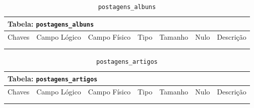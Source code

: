 \documentclass[12pt,a4paper]{article}
\begin{document}
\begin{center}
\begin{table}[h!]
	\caption{\texttt{postagens\_albuns}}
	\label{tabela:postagensAlbuns}
	\begin{tabular}{|p{1cm}|p{1.5cm}|p{1.25cm}|p{1.25cm}|p{1.75cm}|p{1.25cm}|p{4.5cm}|}\hline	
		\multicolumn{7}{|p{16cm}|}{\cellcolor{cinzaClaro}  \centering Tabela: \texttt{postagens\_albuns}} \\ \hline %
		{\small Chaves} & {\small Campo Lógico} & {\small Campo Físico} & {\small Tipo} & {\small Tamanho} & {\small Nulo} & {\small Descrição}\\\hline %
		
		{\tiny } & {\tiny } & {\tiny } & {\tiny } & {\tiny } & {\tiny } &{\tiny }\\\hline
		{\tiny } & {\tiny } & {\tiny } & {\tiny } & {\tiny } & {\tiny } &{\tiny }\\\hline
		
			
	\end{tabular}
\end{table}	
\end{center}

\begin{center}
\begin{table}[h!]
	\caption{\texttt{postagens\_artigos}}
	\label{tabela:postagensArtigos}
	\begin{tabular}{|p{1cm}|p{1.5cm}|p{1.25cm}|p{1.25cm}|p{1.75cm}|p{1.25cm}|p{4.5cm}|}\hline	
		\multicolumn{7}{|p{16cm}|}{\cellcolor{cinzaClaro}  \centering Tabela: \texttt{postagens\_artigos}} \\ \hline %
		{\small Chaves} & {\small Campo Lógico} & {\small Campo Físico} & {\small Tipo} & {\small Tamanho} & {\small Nulo} & {\small Descrição}\\\hline %
		
		{\tiny } & {\tiny } & {\tiny } & {\tiny } & {\tiny } & {\tiny } &{\tiny }\\\hline
		{\tiny } & {\tiny } & {\tiny } & {\tiny } & {\tiny } & {\tiny } &{\tiny }\\\hline
		
			
	\end{tabular}
\end{table}	
\end{center}
\end{document}
